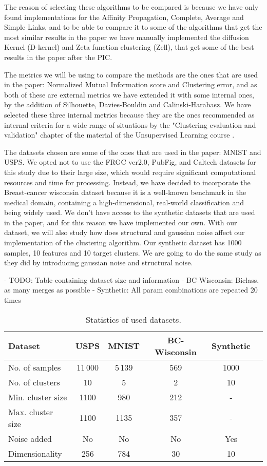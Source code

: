 \documentclass[
	10pt,
	parskip=half-,	
	paper=a4,
	english
	]{scrartcl}
\begin{document}
The reason of selecting these algorithms to be compared is because we have only found implementations for the Affinity Propagation, Complete, Average and Simple Links, and to be able to compare it to some of the algorithms that get the most similar results in the paper we have manually implemented the diffusion Kernel (D-kernel) and Zeta function clustering (Zell), that get some of the best results in the paper after the PIC.

The metrics we will be using to compare the methods are the ones that are used in the paper: Normalized Mutual Information score and Clustering error, and as both of these are external metrics we have extended it with some internal ones, by the addition of Silhouette, Davies-Bouldin and Calinski-Harabasz. We have selected these three internal metrics because they are the ones recommended as internal criteria for a wide range of situations by the "Clustering evaluation and validation" chapter of the material of the Unsupervised Learning course \cite{citation2}. 

The datasets chosen are some of the ones that are used in the paper: MNIST and USPS. We opted not to use the FRGC ver2.0, PubFig, and Caltech datasets for this study due to their large size, which would require significant computational resources and time for processing. Instead, we have decided to incorporate the Breast-cancer wisconsin dataset because it is a well-known benchmark in the medical domain, containing a high-dimensional, real-world classification and being widely used. We don't have access to the synthetic datasets that are used in the paper, and for this reason we have implemented our own. With our dataset, we will also study how does structural and gaussian noise affect our implementation of the clustering algorithm. Our synthetic dataset has 1000 samples, 10 features and 10 target clusters. We are going to do the same study as they did by introducing gaussian noise and structural noise.

- TODO: Table containing dataset size and information
- BC Wisconsin: Biclass, as many merges as possible
- Synthetic: All param combinations are repeated 20 times
\begin{table}[h]
\centering
\caption{Statistics of used datasets.}
\begin{tabular}{lccccc}
\toprule
\textbf{Dataset} & \textbf{USPS} & \textbf{MNIST} & \textbf{BC-Wisconsin} & \textbf{Synthetic}\\
\midrule
No. of samples     & 11\,000 & 5\,139 & 569 & 1000 \\
No. of clusters    & 10     & 5     & 2    & 10   \\
Min. cluster size  & 1100   & 980   & 212     & - \\
Max. cluster size  & 1100   & 1135  & 357     & - \\
Noise added  & No   & No  & No     & Yes \\
Dimensionality     & 256    & 784   & 30   & 10 \\
\bottomrule
\end{tabular}
\end{table}
\end{document}
